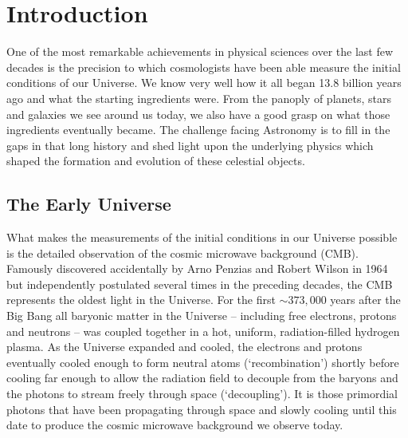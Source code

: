 
\chapter[Introduction]{Introduction}\label{ch:introduction}

One of the most remarkable achievements in physical sciences over the last few decades is the precision to which cosmologists have been able measure the initial conditions of our Universe. We know very well how it all began 13.8 billion years ago and what the starting ingredients were. From the panoply of planets, stars and galaxies we see around us today, we also have a good grasp on what those ingredients eventually became. The challenge facing Astronomy is to fill in the gaps in that long history and shed light upon the underlying physics which shaped the formation and evolution of these celestial objects.

\section{The Early Universe}
What makes the measurements of the initial conditions in our Universe possible is the detailed observation of the cosmic microwave background (CMB). Famously discovered accidentally by Arno Penzias and Robert Wilson in 1964 \citep{Penzias:1965es} but independently postulated several times in the preceding decades, the CMB represents the oldest light in the Universe. For the first $\sim 373,000$ years after the Big Bang all baryonic matter in the Universe -- including free electrons, protons and neutrons -- was coupled together in a hot, uniform, radiation-filled hydrogen plasma. As the Universe expanded and cooled, the electrons and protons eventually cooled enough to form neutral atoms (`recombination') shortly before cooling far enough to allow the radiation field to decouple from the baryons and the photons to stream freely through space (`decoupling'). It is those primordial photons that have been propagating through space and slowly cooling until this date to produce the cosmic microwave background we observe today.

